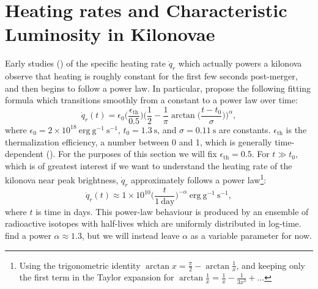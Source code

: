 \documentclass[twocolumn]{aastex63}
\begin{document}
\section{Heating rates and Characteristic Luminosity in Kilonovae}\label{app:heating}

Early studies (\citealt{metzger10, korobkin12}) of the specific heating rate $\dot{q}_r$ which actually powers a kilonova observe that heating is roughly constant for the first few seconds post-merger, and then begins to follow a power law. In particular, \cite{korobkin12} propose the following fitting formula which transitions smoothly from a constant to a power law over time:
\begin{equation}\label{eqn:qdot}
\dot{q}_r(t) = \epsilon_0 \Big( \frac{\epsilon_{\mathrm{th}}}{0.5} \Big)\Big(\frac{1}{2} - \frac{1}{\pi}\arctan{\big(\frac{t-t_0}{\sigma}\big)} \Big)^{\alpha} ,
\end{equation}
where $\epsilon_0 = 2\times10^{18}~\mathrm{erg~g^{-1}~s^{-1}}$, $t_0=1.3~{\mathrm{s}}$, and $\sigma=0.11~{\mathrm{s}}$ are constants. $\epsilon_{\mathrm{th}}$ is the thermalization efficiency, a number between 0 and 1, which is generally time-dependent (\citealt{barnes16}). For the purposes of this section we will fix $\epsilon_{\mathrm{th}}=0.5$. For $t \gg t_0$, which is of greatest interest if we want to understand the heating rate of the kilonova near peak brightness, $\dot{q}_r$ approximately follows a power law\footnote{Using the trigonometric identity $\arctan{x} = \frac{\pi}{2} - \arctan{\frac{1}{x}}$, and keeping only the first term in the Taylor expansion for $\arctan{\frac{1}{x}} = \frac{1}{x} - \frac{1}{3x^3} + ...$}:
\begin{equation}\label{eqn:qdot_plaw}
\dot{q}_r(t) \approx 1\times10^{10} \Big(\frac{t}{\mathrm{1~day}}\Big)^{-\alpha}~\mathrm{erg~g^{-1}~s^{-1}} ,
\end{equation}
where $t$ is time in days. This power-law behaviour is produced by an ensemble of radioactive isotopes with half-lives which are uniformly distributed in log-time. \cite{korobkin12} find a power $\alpha\approx1.3$, but we will instead leave $\alpha$ as a variable parameter for now. 
\end{document}
